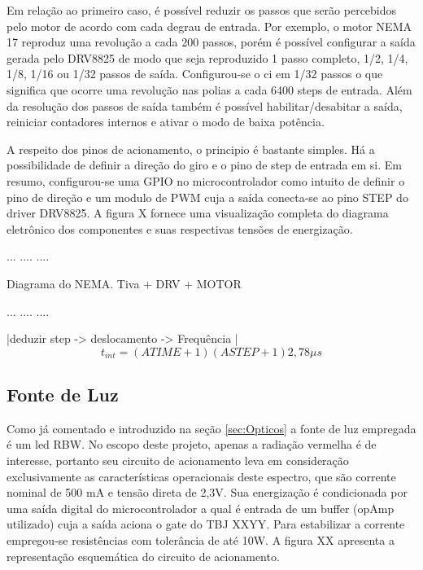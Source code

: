 \documentclass[oneside,openright,12pt]{ufsm_2021} %
\begin{document}
            \par Em relação ao primeiro caso, é possível reduzir os passos que serão percebidos pelo motor de acordo com cada degrau de entrada. Por exemplo, o motor NEMA 17 reproduz uma revolução a cada 200 passos, porém é possível configurar a saída gerada pelo DRV8825 de modo que seja reproduzido 1 passo completo, 1/2, 1/4, 1/8, 1/16 ou 1/32 passos de saída. Configurou-se o ci em 1/32 passos o que significa que ocorre uma revolução nas polias a cada 6400 steps de entrada. Além da resolução dos passos de saída também é possível habilitar/desabitar a saída, reiniciar contadores internos e ativar o modo de baixa potência.

            \par A respeito dos pinos de acionamento, o principio é bastante simples. Há a possibilidade de definir a direção do giro e o pino de step de entrada em si. Em resumo, configurou-se uma GPIO no microcontrolador como intuito de definir o pino de direção e um modulo de PWM cuja a saída conecta-se ao pino STEP do driver DRV8825. A figura X fornece uma visualização completa do diagrama eletrônico dos componentes e suas respectivas tensões de energização.

            \par ...    ....    ....
            \par Diagrama do NEMA. Tiva + DRV + MOTOR
            \par ...    ....    ....    

            \par |deduzir step -> deslocamento -> Frequência |
            \begin{equation}
            \label{eq:MotorVelo}
                t_{int}=(ATIME+1)(ASTEP+1)2,78\mu s
            \end{equation}
            
        \subsection{Fonte de Luz}
            \par Como já comentado e introduzido na seção \ref{sec:Opticos} a fonte de luz empregada é um led RBW. No escopo deste projeto, apenas a radiação vermelha é de interesse, portanto seu circuito de acionamento leva em consideração exclusivamente as características operacionais deste espectro, que são corrente nominal de 500 mA e tensão direta de 2,3V. Sua energização é condicionada por uma saída digital do microcontrolador a qual é entrada de um buffer (opAmp utilizado) cuja a saída aciona o gate do TBJ XXYY. Para estabilizar a corrente empregou-se resistências com tolerância de até 10W. A figura XX apresenta a representação esquemática do circuito de acionamento.
\end{document}

